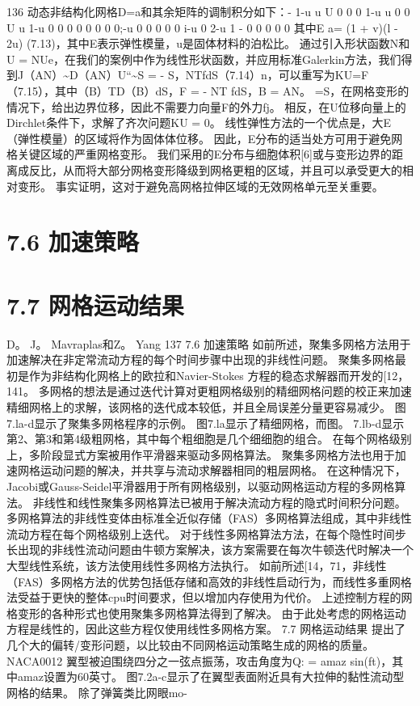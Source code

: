 \documentclass[UTF8,11pt,a4paper,openany,fontset=fandol]{ctexbook}
\begin{document}
136 动态非结构化网格D=a和其余矩阵的调制积分如下：- 1-u u U 0 0 0 1-u u 0 0 U u 1-u 0 0 0 0 0 0 0 0;-u 0 0 0 0 0 i-u 0 2-u 1 - 0 0 0 0 0 其中E a= (1 + v)(l - 2u) (7.13)，其中E表示弹性模量，u是固体材料的泊松比。 通过引入形状函数N和U = NUe，在我们的案例中作为线性形状函数，并应用标准Galerkin方法，我们得到J（AN）\textasciitilde{}D（AN）U“\textasciitilde{}S = - S，NTfdS（7.14）n，可以重写为KU=F（7.15），其中（B）TD（B）dS，F = - NT fdS，B = AN。 =S，在网格变形的情况下，给出边界位移，因此不需要力向量F的外力fj。 相反，在U位移向量上的Dirchlet条件下，求解了齐次问题KU = 0。 线性弹性方法的一个优点是，大E（弹性模量）的区域将作为固体体位移。 因此，E分布的适当处方可用于避免网格关键区域的严重网格变形。 我们采用的E分布与细胞体积[6]或与变形边界的距离成反比，从而将大部分网格变形降级到网格更粗的区域，并且可以承受更大的相对变形。 事实证明，这对于避免高网格拉伸区域的无效网格单元至关重要。

\section{7.6 加速策略}
\section{7.7 网格运动结果}
D。 J。 Mavraplas和Z。 Yang 137 7.6 加速策略 如前所述，聚集多网格方法用于加速解决在非定常流动方程的每个时间步骤中出现的非线性问题。 聚集多网格最初是作为非结构化网格上的欧拉和Navier-Stokes 方程的稳态求解器而开发的[12，141。 多网格的想法是通过迭代计算对更粗网格级别的精细网格问题的校正来加速精细网格上的求解，该网格的迭代成本较低，并且全局误差分量更容易减少。 图7.la-d显示了聚集多网格程序的示例。 图7.la显示了精细网格，而图。 7.lb-d显示第2、第3和第4级粗网格，其中每个粗细胞是几个细细胞的组合。 在每个网格级别上，多阶段显式方案被用作平滑器来驱动多网格算法。 聚集多网格方法也用于加速网格运动问题的解决，并共享与流动求解器相同的粗层网格。 在这种情况下，Jacobi或Gauss-Seidel平滑器用于所有网格级别，以驱动网格运动方程的多网格算法。 非线性和线性聚集多网格算法已被用于解决流动方程的隐式时间积分问题。 多网格算法的非线性变体由标准全近似存储（FAS）多网格算法组成，其中非线性流动方程在每个网格级别上迭代。 对于线性多网格算法方法，在每个隐性时间步长出现的非线性流动问题由牛顿方案解决，该方案需要在每次牛顿迭代时解决一个大型线性系统，该方法使用线性多网格方法执行。 如前所述[14，71，非线性（FAS）多网格方法的优势包括低存储和高效的非线性启动行为，而线性多重网格法受益于更快的整体cpu时间要求，但以增加内存使用为代价。 上述控制方程的网格变形的各种形式也使用聚集多网格算法得到了解决。 由于此处考虑的网格运动方程是线性的，因此这些方程仅使用线性多网格方案。 7.7 网格运动结果 提出了几个大的偏转/变形问题，以比较由不同网格运动策略生成的网格的质量。 NACA0012 翼型被迫围绕四分之一弦点振荡，攻击角度为Q: = amaz sin(ft)，其中amaz设置为60英寸。 图7.2a-c显示了在翼型表面附近具有大拉伸的黏性流动型网格的结果。 除了弹簧类比网眼mo-
\end{document}
